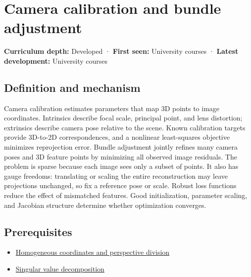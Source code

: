 \hypertarget{appendix-3ee9861904d5}{}\label{referencestart:appendix-3ee9861904d5}
\section{Camera calibration and bundle adjustment}\label{appendix-3ee9861904d5-camera-calibration-and-bundle-adjustment}

\hypertarget{appendix-3ee9861904d5-camera-calibration-and-bundle-adjustment}{}

\textbf{Curriculum depth:} Developed · \textbf{First seen:} University courses · \textbf{Latest development:} University courses

\begin{allmightroledefinition}

\subsection{Definition and mechanism}\label{appendix-3ee9861904d5-definition-and-mechanism}

\hypertarget{appendix-3ee9861904d5-definition-and-mechanism}{}

Camera calibration estimates parameters that map 3D points to image coordinates. Intrinsics describe focal scale, principal point, and lens distortion; extrinsics describe camera pose relative to the scene. Known calibration targets provide 3D-to-2D correspondences, and a nonlinear least-squares objective minimizes reprojection error. Bundle adjustment jointly refines many camera poses and 3D feature points by minimizing all observed image residuals. The problem is sparse because each image sees only a subset of points. It also has gauge freedoms: translating or scaling the entire reconstruction may leave projections unchanged, so fix a reference pose or scale. Robust loss functions reduce the effect of mismatched features. Good initialization, parameter scaling, and Jacobian structure determine whether optimization converges.

\end{allmightroledefinition}

\subsection{Prerequisites}\label{appendix-3ee9861904d5-prerequisites}

\hypertarget{appendix-3ee9861904d5-prerequisites}{}

\begin{itemize}
\tightlist
\item
  \hyperref[appendix-cb3b26862282]{Homogeneous coordinates and perspective division}
\item
  \hyperref[appendix-1fad5e7f36fa]{Singular value decomposition}
\end{itemize}

